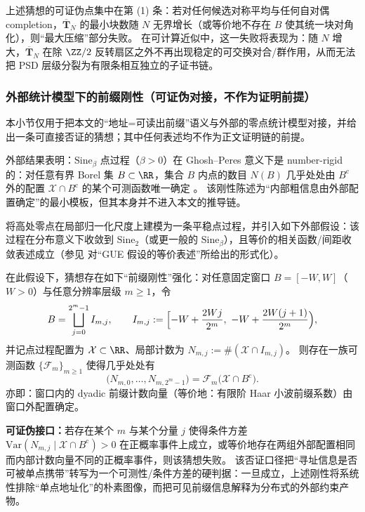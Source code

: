 \begin{remark}\label{rem:discussion-phi-slice-falsifiability}
上述猜想的可证伪点集中在第 (1) 条：若对任何候选对称平均与任何自对偶 completion，\(\overline{\mathbf{T}}_N\) 的最小块数随 \(N\) 无界增长（或等价地不存在 \(B\) 使其统一块对角化），则“最大压缩”部分失败。
在可计算近似中，这一失败将表现为：随 \(N\) 增大，\(\overline{\mathbf{T}}_N\) 在除 \(\ZZ/2\) 反转扇区之外不再出现稳定的可交换对合/群作用，从而无法把 PSD 层级分裂为有限条相互独立的子证书链。
\end{remark}

\subsubsection{外部统计模型下的前缀刚性（可证伪对接，不作为证明前提）}\label{subsubsec:discussion-prefix-rigidity}
本小节仅用于把本文的“地址=\;可读出前缀”语义与外部的零点统计模型对接，并给出一条可直接否证的猜想；其中任何表述均不作为正文证明链的前提。

\begin{remark}\label{rem:discussion-sinebeta-number-rigidity}
外部结果表明：\(\mathrm{Sine}_{\beta}\) 点过程（\(\beta>0\)）在 Ghosh--Peres 意义下是 number-rigid 的：对任意有界 Borel 集 \(B\subset\RR\)，集合 \(B\) 内点的数目 \(N(B)\) 几乎处处由 \(B^{\mathrm c}\) 外的配置 \(\mathcal X\cap B^{\mathrm c}\) 的某个可测函数唯一确定 \cite{ChhaibiNajnudel2018RigiditySineBeta}。
该刚性陈述为“内部粗信息由外部配置确定”的最小模板，但其本身并不进入本文的推导链。
\end{remark}

\begin{conjecture}\label{conj:discussion-zeta-prefix-rigidity}
将高处零点在局部归一化尺度上建模为一条平稳点过程，并引入如下外部假设：该过程在分布意义下收敛到 \(\mathrm{Sine}_{2}\)（或更一般的 \(\mathrm{Sine}_{\beta}\)），且等价的相关函数/间距收敛表述成立（参见 \cite{AriasDeReynaRodgers2024ConvergencePointsZetaZeros} 对“GUE 假设的等价表述”所给出的形式化）。
\par
在此假设下，猜想存在如下“前缀刚性”强化：对任意固定窗口 \(B=[-W,W]\)（\(W>0\)）与任意分辨率层级 \(m\ge 1\)，令
\[
B=\bigsqcup_{j=0}^{2^{m}-1} I_{m,j},
\qquad
I_{m,j}:=\Bigl[-W+\frac{2Wj}{2^{m}},\ -W+\frac{2W(j+1)}{2^{m}}\Bigr),
\]
并记点过程配置为 \(\mathcal X\subset\RR\)、局部计数为 \(N_{m,j}:=\#(\mathcal X\cap I_{m,j})\)。
则存在一族可测函数 \(\{\mathcal F_m\}_{m\ge 1}\) 使得几乎处处有
\[
\bigl(N_{m,0},\dots,N_{m,2^{m}-1}\bigr)
=\mathcal F_m\!\bigl(\mathcal X\cap B^{\mathrm c}\bigr).
\]
亦即：窗口内的 dyadic 前缀计数向量（等价地：有限阶 Haar 小波前缀系数）由窗口外配置确定。
\par
\textbf{可证伪接口：}若存在某个 \(m\) 与某个分量 \(j\) 使得条件方差
\(
\mathrm{Var}(N_{m,j}\mid \mathcal X\cap B^{\mathrm c})>0
\)
在正概率事件上成立，或等价地存在两组外部配置相同而内部计数向量不同的正概率事件，则该猜想失败。
该否证口径把“寻址信息是否可被单点携带”转写为一个可测性/条件方差的硬判据：一旦成立，上述刚性将系统性排除“单点地址化”的朴素图像，而把可见前缀信息解释为分布式的外部约束产物。
\end{conjecture}

